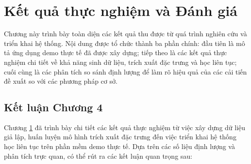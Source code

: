 \chapter{Kết quả thực nghiệm và Đánh giá}
\label{chap:c4}

Chương này trình bày toàn diện các kết quả thu được từ quá trình nghiên cứu và triển khai hệ thống. Nội dung được tổ chức thành ba phần chính: đầu tiên là mô tả ứng dụng demo thực tế đã được xây dựng; tiếp theo là các kết quả thực nghiệm chi tiết về khả năng sinh dữ liệu, trích xuất đặc trưng và học liên tục; cuối cùng là các phân tích so sánh định lượng để làm rõ hiệu quả của các cải tiến đề xuất so với các phương pháp cơ sở.




%


\section*{Kết luận Chương 4}


Chương \ref{chap:c4} đã trình bày chi tiết các kết quả thực nghiệm từ việc xây dựng dữ liệu giả lập, huấn luyện mô hình trích xuất đặc trưng đến việc triển khai hệ thống học liên tục trên phần mềm demo thực tế. Dựa trên các số liệu định lượng và phân tích trực quan, có thể rút ra các kết luận quan trọng sau:

